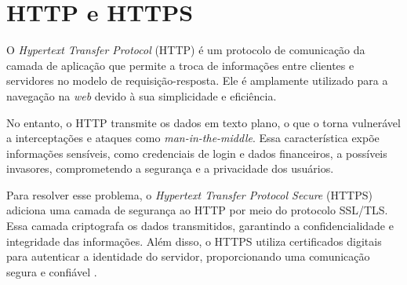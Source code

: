 \section{HTTP e HTTPS}

O \emph{Hypertext Transfer Protocol} (HTTP) é um protocolo de comunicação da camada de aplicação que permite a troca de informações entre clientes e servidores no modelo de requisição-resposta. Ele é amplamente utilizado para a navegação na \emph{web} devido à sua simplicidade e eficiência.

No entanto, o HTTP transmite os dados em texto plano, o que o torna vulnerável a interceptações e ataques como \emph{man-in-the-middle}. Essa característica expõe informações sensíveis, como credenciais de login e dados financeiros, a possíveis invasores, comprometendo a segurança e a privacidade dos usuários.

Para resolver esse problema, o \emph{Hypertext Transfer Protocol Secure} (HTTPS) adiciona uma camada de segurança ao HTTP por meio do protocolo SSL/TLS. Essa camada criptografa os dados transmitidos, garantindo a confidencialidade e integridade das informações. Além disso, o HTTPS utiliza certificados digitais para autenticar a identidade do servidor, proporcionando uma comunicação segura e confiável .





